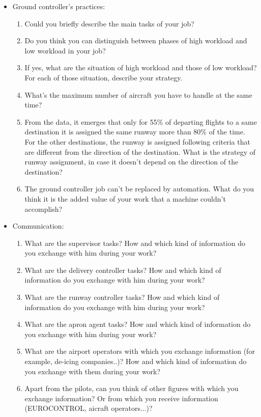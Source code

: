 \documentclass{article}
\begin{document}
\begin{itemize}
\begin{enumerate}
        \end{enumerate}
    \item Ground controller's practices:
        \begin{enumerate}
        	\item Could you briefly describe the main tasks of your job?
        	\item Do you think you can distinguish between phases of high workload and low workload in your job? 
        	\item If yes, what are the situation of high workload and those of low workload? For each of those situation, describe your strategy.
            \item What's the maximum number of aircraft you have to handle at the same time?
            \item From the data, it emerges that only for 55\% of departing flights to a same destination it is assigned the same runway more than 80\% of the time. For the other destinations, the runway is assigned following criteria that are different from the direction of the destination. What is the strategy of runway assignment, in case it doesn't depend on the direction of the destination?
            \item The ground controller job can't be replaced by automation. What do you think it is the added value of your work that a machine couldn't accomplish?
        \end{enumerate}
    \item Communication:
        \begin{enumerate}
            \item What are the supervisor tasks? How and which kind of information do you exchange with him during your work?
            \item What are the delivery controller tasks? How and which kind of information do you exchange with him during your work?
            \item What are the runway controller tasks? How and which kind of information do you exchange with him during your work?
            \item What are the apron agent tasks? How and which kind of information do you exchange with him during your work?
            \item What are the airport operators with which you exchange information (for example, de-icing companies..)? How and which kind of information do you exchange with them during your work?
            \item Apart from the pilots, can you think of other figures with which you exchange information? Or from which you receive information (EUROCONTROL, aicraft operators...)?

\end{enumerate}
\end{itemize}
\end{document}
